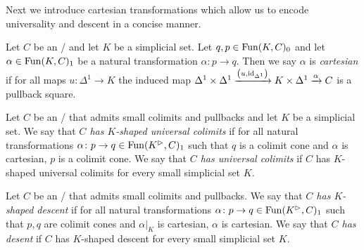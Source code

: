 Next we introduce cartesian transformations which allow us to encode universality and descent in a concise manner.
\begin{definition}
    Let $C$ be an \inftycat/ and let $K$ be a simplicial set.
    Let $q,p\in\operatorname{Fun}(K,C)_0$ and let $\alpha\in\operatorname{Fun}(K,C)_1$ be a natural transformation $\alpha\colon p\to q$.
    Then we say $\alpha$ is \emph{cartesian} if for all maps $u\colon\Delta^1\to K$ the induced map $\Delta^1\times\Delta^1\xrightarrow{\left(u,\text{id}_{\Delta^1}\right)}K\times\Delta^1\xrightarrow{\alpha}C$ is a pullback square. %
\end{definition}
\begin{definition}[Universality]
    Let $C$ be an \inftycat/ that admits small colimits and pullbacks and let $K$ be a simplicial set.
    We say that \emph{$C$ has $K$-shaped universal colimits} if for all natural transformations $\alpha\colon p\to q\in\operatorname{Fun}(K^{\rhd},C)_1$ such that $q$ is a colimit cone and $\alpha$ is cartesian, $p$ is a colimit cone.
    We say that \emph{$C$ has universal colimits} if $C$ has $K$-shaped universal colimits for every small simplicial set $K$.
\end{definition}
\begin{definition}[Descent]
    Let $C$ be an \inftycat/ that admits small colimits and pullbacks.
    We say that \emph{$C$ has $K$-shaped descent} if for all natural transformations $\alpha\colon p\to q\in\operatorname{Fun}(K^{\rhd},C)_1$ such that $p,q$ are colimit cones and $\alpha|_K$ is cartesian, $\alpha$ is cartesian.
    We say that \emph{$C$ has desent} if $C$ has $K$-shaped descent for every small simplicial set $K$.
\end{definition}
